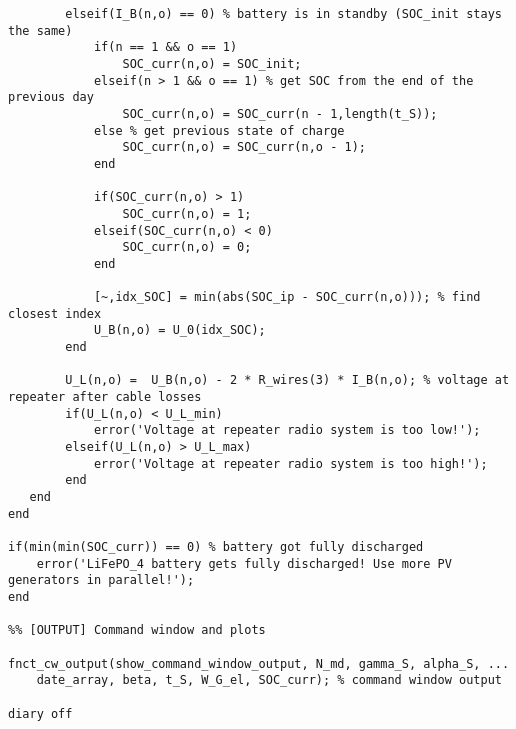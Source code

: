 \begin{lstlisting}
        elseif(I_B(n,o) == 0) % battery is in standby (SOC_init stays the same)
            if(n == 1 && o == 1)
                SOC_curr(n,o) = SOC_init;
            elseif(n > 1 && o == 1) % get SOC from the end of the previous day
                SOC_curr(n,o) = SOC_curr(n - 1,length(t_S));
            else % get previous state of charge
                SOC_curr(n,o) = SOC_curr(n,o - 1);
            end
            
            if(SOC_curr(n,o) > 1)
                SOC_curr(n,o) = 1;
            elseif(SOC_curr(n,o) < 0)
                SOC_curr(n,o) = 0;
            end
            
            [~,idx_SOC] = min(abs(SOC_ip - SOC_curr(n,o))); % find closest index
            U_B(n,o) = U_0(idx_SOC);
        end 
        
        U_L(n,o) =  U_B(n,o) - 2 * R_wires(3) * I_B(n,o); % voltage at repeater after cable losses
        if(U_L(n,o) < U_L_min)
            error('Voltage at repeater radio system is too low!');
        elseif(U_L(n,o) > U_L_max)
            error('Voltage at repeater radio system is too high!');
        end
   end
end

if(min(min(SOC_curr)) == 0) % battery got fully discharged
    error('LiFePO_4 battery gets fully discharged! Use more PV generators in parallel!');
end

%% [OUTPUT] Command window and plots

fnct_cw_output(show_command_window_output, N_md, gamma_S, alpha_S, ...
    date_array, beta, t_S, W_G_el, SOC_curr); % command window output
 
diary off
\end{lstlisting}